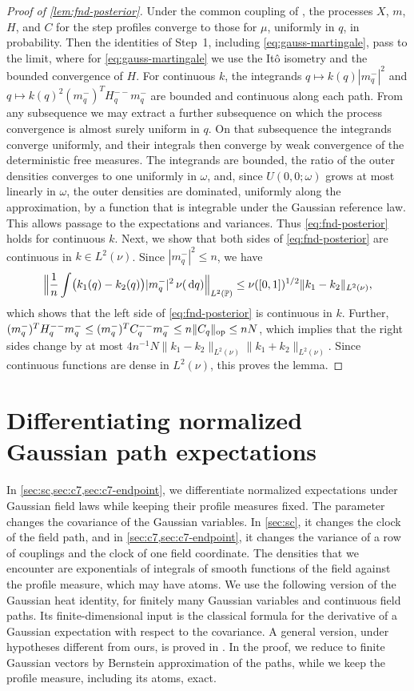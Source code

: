 \begin{proof}[Proof of \cref{lem:fnd-posterior}]
Under the common coupling of \cite[Section~2.6.1]{AL}, the processes
$X$, $m$, $H$, and $C$ for the step profiles converge to those for $\mu$,
uniformly in $q$, in probability. Then the identities of Step~1, including
\eqref{eq:gauss-martingale},
pass to the limit, where for \eqref{eq:gauss-martingale} we use the It\^o
isometry and the bounded
convergence of $H$. For continuous $k$, the integrands
$q\mapsto k(q)|m_q^-|^2$ and $q\mapsto k(q)^2(m_q^-)^TH_q^{--}m_q^-$ are
bounded and continuous along each path. From any subsequence we may
extract a further subsequence on which the process convergence is
almost surely uniform in $q$. On that subsequence the integrands
converge uniformly, and their integrals then converge by weak
convergence of the deterministic free measures. The integrands are bounded, the ratio of the outer densities converges
to one uniformly in $\omega$, and, since $U(0,0;\omega)$ grows at most
linearly in $\omega$, the outer densities are dominated, uniformly along
the approximation, by a function that is integrable under the Gaussian
reference law. This allows passage to the expectations and variances. Thus \eqref{eq:fnd-posterior} holds for continuous $k$.
Next, we
show that both sides of \eqref{eq:fnd-posterior} are continuous
in $k\in L^2(\nu)$. Since $|m_q^-|^2\le n$, we have
\[
 \Bigl\|\frac1n\int\bigl(k_1(q)-k_2(q)\bigr)|m_q^-|^2\,\nu(\,\mathrm d q)\Bigr\|_{L^2(\mathbb P)}
 \le\nu([0,1])^{1/2}\|k_1-k_2\|_{L^2(\nu)},
\]
which shows that the left side of \eqref{eq:fnd-posterior} is
continuous in $k$. Further,
$(m_q^-)^TH_q^{--}m_q^-\le(m_q^-)^TC_q^{--}m_q^-\le n\|C_q\|_{\rm op}\le nN$,
which implies that the right sides change by at most
$4n^{-1}N\|k_1-k_2\|_{L^2(\nu)}\|k_1+k_2\|_{L^2(\nu)}$. Since continuous
functions are dense in $L^2(\nu)$, this proves the lemma.
\end{proof}

\section{Differentiating normalized Gaussian path expectations}
\label{sec:gauss-heat}

In \cref{sec:sc,sec:c7,sec:c7-endpoint}, we differentiate normalized
expectations under Gaussian field laws while keeping their profile
measures fixed. The parameter changes the covariance of the Gaussian
variables. In
\cref{sec:sc}, it changes the clock of the field path, and in
\cref{sec:c7,sec:c7-endpoint}, it changes the variance of a row of
couplings and the clock of one field coordinate. The densities that we
encounter are exponentials of
integrals of smooth functions of the field against the profile measure,
which may have atoms. We use the following version of the Gaussian heat
identity, for finitely many Gaussian variables and continuous field
paths. Its finite-dimensional input is the classical formula for the
derivative of a Gaussian expectation with respect to the covariance. A
general version, under hypotheses
different from ours, is proved in \cite[Theorem~1]{Voigtlaender2021Price}.
In the proof, we reduce to
finite Gaussian vectors by Bernstein approximation of the paths, while we
keep the profile measure, including its atoms, exact.

